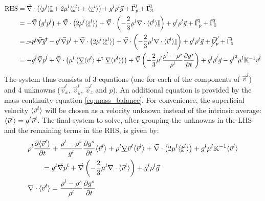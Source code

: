 \begin{subequations}
\begin{align}
\label{eq:momentum_liq_RHS}
	\text{RHS} 
	&=
	 \vec{\nabla} \cdot \left( \langle p^l \rangle \underline{\mathbb{I}} + 2\mu^{l} \langle {\dot{\ensuremath{\underline{\varepsilon}}}}^l \rangle + \langle \underline{\tau}^l \rangle \right) 
	 + {g^l} \rho^l \vec{g} 
	 + \vec{\Gamma}_{p}^{l} + \vec{\Gamma}_{\mathbb{S}}^{l}	 \\
	&=  -\vec{\nabla} \left( {g^l} p^l \right) 
		+ \vec{\nabla} \cdot \left(  2 \mu^l \langle {\dot{\ensuremath{\underline{\varepsilon}}}}^l \rangle  \right)
		+ \vec{\nabla} \cdot \left( -\frac{2}{3} \mu^l \nabla \cdot \langle \vec{v}^l \rangle \underline{\mathbb{I}} \right)
		+ {g^l} \rho^l \vec{g} 
	 	+ \vec{\Gamma}_{p}^{l} + \vec{\Gamma}_{\mathbb{S}}^{l}	 \\
	&=  \cancel{- p^l \vec{\nabla} {g^l}} - {g^l} \vec{\nabla} p^l
		+ \vec{\nabla} \cdot \left(  2 \mu^l \langle {\dot{\ensuremath{\underline{\varepsilon}}}}^l \rangle  \right)
		+ \vec{\nabla} \cdot \left( -\frac{2}{3} \mu^l \nabla \cdot \langle \vec{v}^l \rangle \underline{\mathbb{I}} \right)
		+ {g^l} \rho^l \vec{g} 
	 	+ \cancel{\vec{\Gamma}_{p}^{l}} + \vec{\Gamma}_{\mathbb{S}}^{l}	 \\
	&=   - {g^l} \vec{\nabla} p^l
		+ \vec{\nabla} \cdot \left(  \mu^l \left( \underline{\nabla} \langle \vec{v}^l \rangle + ^\text{\textbf{t}} \underline{\nabla} \langle \vec{v}^l \rangle  \right) \right)
		+ \vec{\nabla} \left( -\frac{2}{3} \mu^l \frac{\rho^l-\rho^s}{\rho^l} \frac{\partial  {g^s} }{\partial t}  \right)
		+ {g^l} \rho^l \vec{g} 
	 	- {{g^l}}^{2} \mu^l \mathbb{K}^{-1} \vec{v}^{l}
\end{align}
\end{subequations}
The system thus consists of 3 equations (one for each of the components of $\vec{v}^l$) and 4 unknowns ($\vec{v}^l_x$, $\vec{v}^l_y$, $\vec{v}^l_z$ and $p$). An additional equation is provided by the mass continuity equation \eqref{eq:mass_balance}. For convenience, the superficial velocity $\langle \vec{v}^l \rangle$ will be chosen as a velocity unknown instead of the intrinsic average: $\langle \vec{v}^l \rangle = {g^l} \vec{v}^l$. The final system to 
solve, after grouping the unknowns in the LHS and the remaining terms in the RHS, is given by:
\label{eq:momentum_liq_final}
\begin{align} %
& \rhol \frac{\partial \vit}{\partial t}
	 + \frac{ \rhol - \rhos }{\gl}\frac{\partial  \gs }{\partial t} \vit
	 + \rhol  \nabmat \vl \vit
	 + \nabvec \cdot \brac{2 \mu^l \strainrate}
	 + \gl \mu^l  \mathbb{K}^{-1} \vit  \\
	 &\qquad  = \gl \nabvec p^l
	 + \nabvec \brac{-\frac{2}{3} \mu^l \nabla \cdot \avg{\vec{v}^l}  }
	 +  \gl \rhol \vec{g}  \\
&\nabla \cdot \vit= \frac{\rho^l-\rho^s}{\rho^l} \frac{\partial  \gs }{\partial t}
\end{align} %

